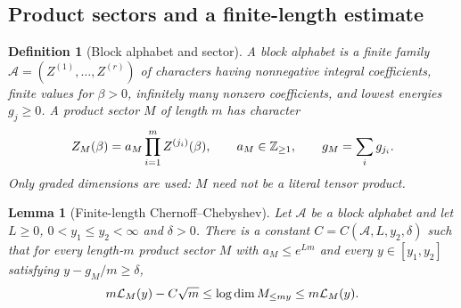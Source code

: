 \documentclass[10pt,a4paper]{article}
\numberwithin{equation}{section}
\newtheorem{lemma}[theorem]{Lemma}\newtheorem{proposition}[theorem]{Proposition}
\newtheorem{definition}[theorem]{Definition}
\theoremstyle{remark}\newtheorem{remark}[theorem]{Remark}\newtheorem{question}[theorem]{Question}
\begin{document}
\subsection{Product sectors and a finite-length estimate}
\begin{definition}[Block alphabet and sector]
A block alphabet is a finite family $\mathcal A=(Z^{(1)},\ldots,Z^{(r)})$ of characters having nonnegative integral coefficients, finite values for $\beta>0$, infinitely many nonzero coefficients, and lowest energies $g_j\ge0$. A product sector $M$ of length $m$ has character
\[
Z_M(\beta)=a_M\prod_{i=1}^m Z^{(j_i)}(\beta),\qquad a_M\in\mathbb Z_{\ge1},\qquad g_M=\sum_i g_{j_i}.
\]
Only graded dimensions are used: $M$ need not be a literal tensor product.
\end{definition}
\begin{lemma}[Finite-length Chernoff--Chebyshev]\label{lem:chebyshev}
Let $\mathcal A$ be a block alphabet and let $L\ge0$, $0<y_1\le y_2<\infty$ and $\delta>0$. There is a constant $C=C(\mathcal A,L,y_2,\delta)$ such that for every length-$m$ product sector $M$ with $a_M\le e^{Lm}$ and every $y\in[y_1,y_2]$ satisfying $y-g_M/m\ge\delta$,
\begin{equation}\label{eq:cheb}
m\mathcal L_M(y)-C\sqrt m\le\log\operatorname{dim} M_{\le my}\le m\mathcal L_M(y).
\end{equation}
\end{lemma}
\end{document}
